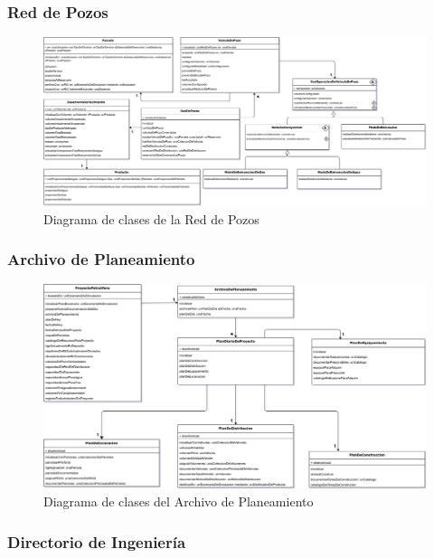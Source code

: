 \documentclass[10pt,a3paper, ,landscape]{article}
\begin{document}
\subsubsection{Red de Pozos}

\begin{figure}[H]
\centerline{\includegraphics[scale=0.38]{images/DiagramaDeClases_deRedDePozos.png}}
\caption{Diagrama de clases de la Red de Pozos}
\end{figure}

\subsubsection{Archivo de Planeamiento}

\begin{figure}[H]
\centerline{\includegraphics[scale=0.8]{images/DiagramaDeClases_ArchivoDePlaneamiento.png}}
\caption{Diagrama de clases del Archivo de Planeamiento}
\end{figure}

\subsubsection{Directorio de Ingeniería}
\end{document}

